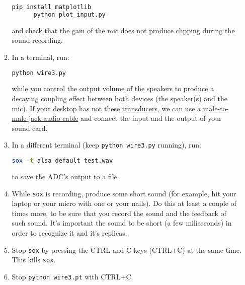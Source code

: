 \begin{enumerate}
\begin{enumerate}
    \begin{lstlisting}[language=Bash]
      pip install matplotlib
      python plot_input.py
    \end{lstlisting}

    and check that the gain of the mic does not
    produce \href{https://en.wikipedia.org/wiki/Clipping_(audio)}{clipping}
    during the sound recording.

  \item \label{start_point} In a terminal, run:

    \begin{lstlisting}[language=Bash]
      python wire3.py
    \end{lstlisting}

    while you control the output volume of the speakers to produce a
    decaying coupling effect between both devices (the speaker(s) and
    the mic). If your desktop has not
    these \href{https://en.wikipedia.org/wiki/Transducer}{transducers},
    we can use
    a \href{https://www.google.com/search?q=male+to+male+audio+jack+cable&client=firefox-b-d&sxsrf=ALeKk00GZUDGqiOfc0D8xkA_MIYgCuZmSA:1600270049146&source=lnms&tbm=isch&sa=X&ved=2ahUKEwjdvsu-_u3rAhXl0eAKHS90DUoQ_AUoAXoECA0QAw&biw=4288&bih=972}{male-to-male
    jack audio cable} and connect the input and the output of your
    sound card.

  \item In a different terminal (keep \texttt{python wire3.py}
    running), run:

    \begin{lstlisting}[language=Bash]
      sox -t alsa default test.wav
    \end{lstlisting}

    to save the ADC's output to a file.

  \item While \texttt{sox} is recording, produce some short sound (for
    example, hit your laptop or your micro with one or your nails). Do
    this at least a couple of times more, to be sure that you record
    the sound and the feedback of such sound. It's important the sound
    to be short (a few miliseconds) in order to recognize it and it's
    replicas.

  \item Stop \texttt{sox} by pressing the CTRL and C keys (CTRL+C) at
    the same time. This kills \texttt{sox}.

  \item Stop \texttt{python wire3.pt} with CTRL+C.


\end{enumerate}
\end{enumerate}
